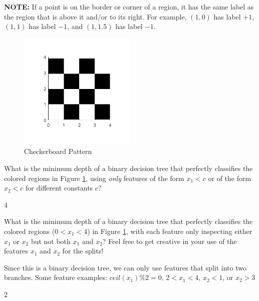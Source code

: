 \documentclass[11pt,addpoints,answers]{exam}
\begin{document}
\begin{questions}
\begin{parts}
    \textbf{NOTE:} If a point is on the border or corner of a region, it has the same label as the region that is above it and/or to its right. For example, $(1, 0)$ has label $+1$, $(1, 1)$ has label $-1$, and $(1, 1.5)$ has label $-1$. 
    \begin{figure}[H]
        \centering
        \includegraphics[width = 0.5\textwidth]{images/checkerboard.png}
        \caption{Checkerboard Pattern} \label{fig:checkerboard}
    \end{figure}
    \begin{subparts}
    
    \clearpage
    \subpart[2] What is the minimum depth of a binary decision tree that perfectly classifies the colored regions in Figure \ref{fig:checkerboard}, using \emph{only} features of the form $x_1 < c$ or of the form $x_2 < c$ for different constants $c$?
    
    \begin{your_solution}[title=Your Answer,height=2cm,width=5cm]
    	4
    \end{your_solution}

    \subpart[2] What is the minimum depth of a binary decision tree that perfectly classifies the colored regions ($0 < x_1 < 4$) in Figure \ref{fig:checkerboard}, with each feature only inspecting either $x_1$ or $x_2$ but not both $x_1$ and $x_2$? Feel free to get creative in your use of the features $x_1$ and $x_2$ for the splits!
    
    Since this is a binary decision tree, we can only use features that split into two branches. Some feature examples: $ceil(x_1)\%2 = 0$, \quad$2<x_1<4$, \quad$x_2<1$, \quad or \quad$x_2>3$

    \begin{your_solution}[title=Your Answer,height=2cm,width=5cm]
    	2
    \end{your_solution}
    

\end{subparts}
\end{parts}
\end{questions}
\end{document}
